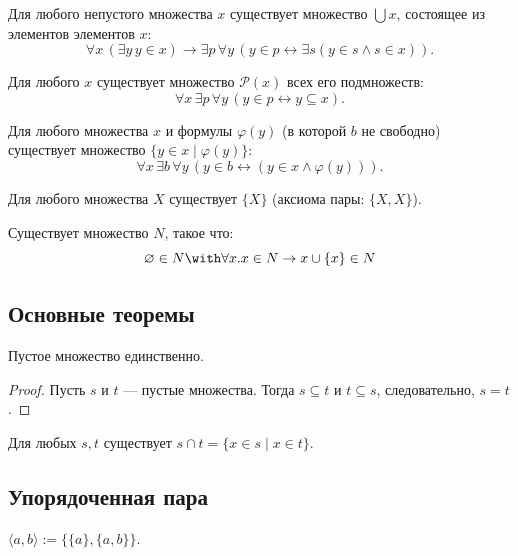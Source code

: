 \documentclass[10pt]{article}
\begin{document}
\begin{definition}
Для любого непустого множества $x$ существует множество $\bigcup x$, состоящее из элементов элементов $x$:
$$ \forall x \, (\exists y \, y \in x) \rightarrow \exists p \, \forall y \, (y \in p \leftrightarrow \exists s (y \in s \land s \in x)). $$
\end{definition}

\begin{definition}
Для любого $x$ существует множество $\mathcal{P}(x)$ всех его подмножеств:
$$ \forall x \, \exists p \, \forall y \, (y \in p \leftrightarrow y \subseteq x). $$
\end{definition}

\begin{definition}
Для любого множества $x$ и формулы $\varphi(y)$ (в которой $b$ не свободно) существует множество $\{ y \in x \mid \varphi(y) \}$:
$$ \forall x \, \exists b \, \forall y \, (y \in b \leftrightarrow (y \in x \land \varphi(y))). $$
\end{definition}

\begin{theorem}
Для любого множества $X$ существует $\{X\}$ (аксиома пары: $\{X, X\}$).
\end{theorem}

\begin{definition}
Существует множество $N$, такое что: $$
\varnothing \in N \with \forall x. x \in N \rightarrow x \cup \{x\} \in N
$$
\end{definition}

\subsection{Основные теоремы}
\begin{theorem}
Пустое множество единственно.
\end{theorem}
\begin{proof}
Пусть $s$ и $t$ — пустые множества. Тогда $s \subseteq t$ и $t \subseteq s$, следовательно, $s = t$.
\end{proof}

\begin{theorem}
Для любых $s, t$ существует $s \cap t = \{ x \in s \mid x \in t \}$.
\end{theorem}

\subsection{Упорядоченная пара}
\begin{definition}
$\langle a, b \rangle := \{ \{a\}, \{a, b\} \}$.
\end{definition}
\end{document}
